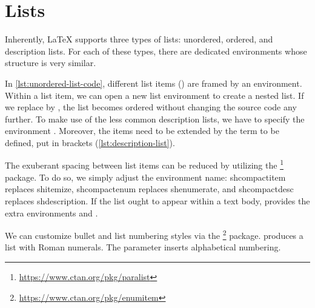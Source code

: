 \chapter{Lists}
\label{sec:lists}

Inherently, \LaTeX{} supports three types of lists: unordered, ordered, and description lists.
For each of these types, there are dedicated environments whose structure is very similar.


In \cref{lst:unordered-list-code}, different list items () are framed by an  environment.
Within a list item, we can open a new list environment to create a nested list.
If we replace  by , the list becomes ordered without changing the source code any further.
To make use of the less common description lists, we have to specify the environment .
Moreover, the items need to be extended by the term to be defined, put in brackets (\cref{lst:description-list}).


The exuberant spacing between list items can be reduced by utilizing the \footnote{\url{https://www.ctan.org/pkg/paralist}} package.
To do so, we simply adjust the environment name: sh{compactitem} replaces sh{itemize}, sh{compactenum} replaces sh{enumerate}, and sh{compactdesc} replaces sh{description}.
If the list ought to appear within a text body,  provides the extra environments  and .

We can customize bullet and list numbering styles via the \footnote{\url{https://www.ctan.org/pkg/enumitem}} package.
 produces a list with Roman numerals. 
The parameter  inserts alphabetical numbering.
